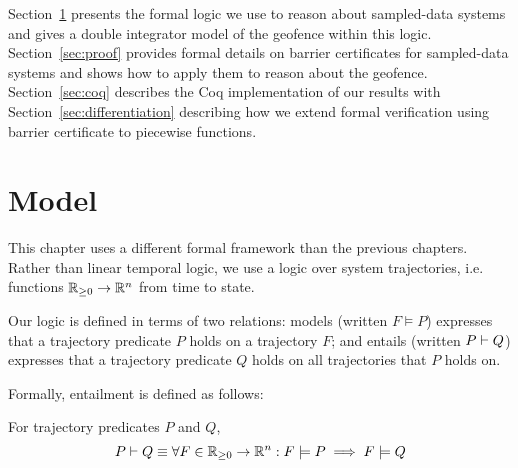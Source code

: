 Section~\ref{sec:model} presents the formal logic we use to reason about
sampled-data systems and gives a double integrator model of the geofence
within this logic. Section~\ref{sec:proof} provides formal details on
barrier certificates for sampled-data systems and shows how to apply them
to reason about the geofence. Section~\ref{sec:coq} describes the Coq
implementation of our results with Section~\ref{sec:differentiation}
describing how we extend formal verification using barrier certificate to
piecewise functions.

\section{Model}
\label{sec:model}
This chapter uses a different formal framework than the previous
chapters. Rather than linear temporal logic, we use a logic over system
trajectories, i.e. functions $\mathbb{R}_{\geq 0} \rightarrow \mathbb{R}^n$ from time to state.

Our logic is defined in terms of two relations: models (written $F \models
P$) expresses that a trajectory predicate $P$ holds on a trajectory $F$;
and entails (written $P \vdash Q$) expresses that a trajectory predicate
$Q$ holds on all trajectories that $P$ holds on.

Formally, entailment is defined as follows:
\begin{definition}[Entailment]
For trajectory predicates $P$ and $Q$,
\[
P \vdash Q \equiv \forall F \in \mathbb{R}_{\geq 0} \rightarrow \mathbb{R}^n : F \models P \implies F \models Q
\]
\label{def:entailment}
\end{definition}

